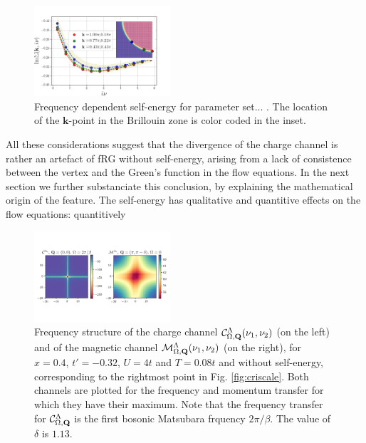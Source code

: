 \begin{figure}
\includegraphics[width=0.45\textwidth]{images/Self_Im_occ0975.png}
\caption{Frequency dependent self-energy for parameter set... .
The location of the $\mathbf{k}$-point in the Brillouin zone is color coded in the inset. }
\label{fig:selffermi0975}
\end{figure}


All these considerations suggest that the divergence of the charge channel is rather an artefact of fRG without self-energy, arising from a lack of consistence between the vertex and the Green's function in the flow equations. 
In the next section we further substanciate this conclusion, by explaining the mathematical origin of the feature. 
The self-energy has qualitative and quantitive effects on the flow equations: quantitively 


\begin{figure}
\includegraphics[width=0.45\textwidth]{images/Phi_color_NOSE_fill0600.png}
\caption{Frequency structure of the charge channel $\mathcal{C}^\Lambda_{\Omega,\mathbf{Q}}(\nu_1,\nu_2)$ (on the left) and of the magnetic channel $\mathcal{M}^\Lambda_{\Omega,\mathbf{Q}}(\nu_1,\nu_2)$ (on the right), for $x=0.4$, $t'=-0.32$, $U=4t$ and $T=0.08t$ and without self-energy, corresponding to the rightmost point in Fig. \ref{fig:criscale}. 
Both channels are plotted for the frequency and momentum transfer for which they have their maximum. Note that the frequency transfer for $\mathcal{C}^\Lambda_{\Omega,\mathbf{Q}}$ is the first bosonic Matsubara frquency $2\pi/\beta$. 
The value of $\delta$ is $1.13$.  
 }  
\label{fig:freqplot} 
\end{figure}


